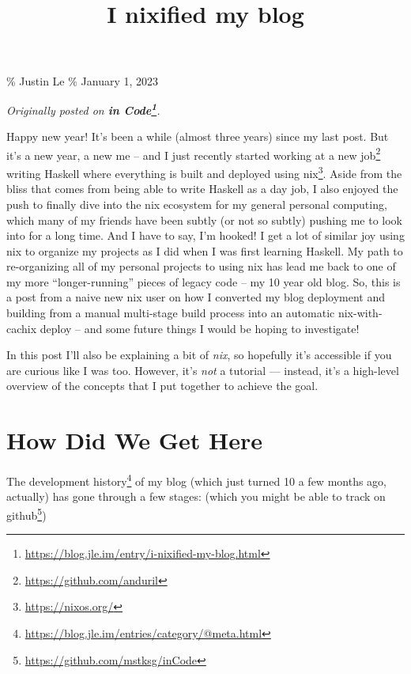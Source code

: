 \documentclass[]{article}
\title{I nixified my blog}
\renewcommand{\href}[2]{#2\footnote{\url{#1}}}
\begin{document}
\maketitle

\% Justin Le \% January 1, 2023

\emph{Originally posted on
\textbf{\href{https://blog.jle.im/entry/i-nixified-my-blog.html}{in Code}}.}

Happy new year! It's been a while (almost three years) since my last post. But
it's a new year, a new me -- and I just recently started working at
\href{https://github.com/anduril}{a new job} writing Haskell where everything is
built and deployed using \href{https://nixos.org/}{nix}. Aside from the bliss
that comes from being able to write Haskell as a day job, I also enjoyed the
push to finally dive into the nix ecosystem for my general personal computing,
which many of my friends have been subtly (or not so subtly) pushing me to look
into for a long time. And I have to say, I'm hooked! I get a lot of similar joy
using nix to organize my projects as I did when I was first learning Haskell. My
path to re-organizing all of my personal projects to using nix has lead me back
to one of my more ``longer-running'' pieces of legacy code -- my 10 year old
blog. So, this is a post from a naive new nix user on how I converted my blog
deployment and building from a manual multi-stage build process into an
automatic nix-with-cachix deploy -- and some future things I would be hoping to
investigate!

In this post I'll also be explaining a bit of \emph{nix}, so hopefully it's
accessible if you are curious like I was too. However, it's \emph{not} a
tutorial --- instead, it's a high-level overview of the concepts that I put
together to achieve the goal.

\section{How Did We Get Here}\label{how-did-we-get-here}

The \href{https://blog.jle.im/entries/category/@meta.html}{development history}
of my blog (which just turned 10 a few months ago, actually) has gone through a
few stages: (which you might be able to track
\href{https://github.com/mstksg/inCode}{on github})
\end{document}
